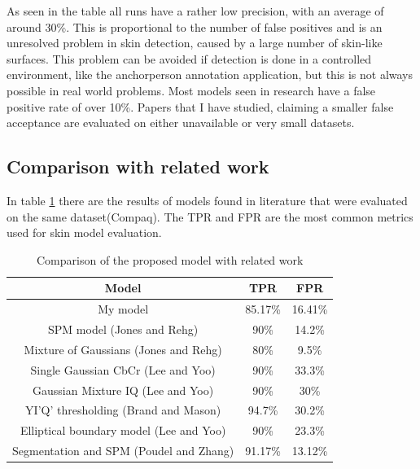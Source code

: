 \documentclass[12pt]{report}
\begin{document}
	As seen in the table all runs have a rather low precision, with an average of around 30\%. This is proportional to the number of false positives and is an unresolved problem in skin detection, caused by a large number of skin-like surfaces. This problem can be avoided if detection is done in a controlled environment, like the anchorperson annotation application, but this is not always possible in real world problems.  Most models seen in research have a false positive rate of over 10\%. Papers that I have studied, claiming a smaller false acceptance are evaluated on either unavailable or very small datasets.

	\subsection{Comparison with related work}
	
	In table \ref{tab:results_comparison} there are the results of models found in literature that were evaluated on the same dataset(Compaq). The TPR and FPR are the most common metrics used for skin model evaluation.
	
	\begin{table}[h!]
		\begin{center}
			\caption{Comparison of the proposed model with related work}
			\label{tab:results_comparison}
			\begin{tabular}{c|c|c}
				\textbf{Model} & \textbf{TPR} & \textbf{FPR} \\
				\hline
				My model & 85.17\% & 16.41\% \\
				SPM model (Jones and Rehg\cite{compaq}) & 90\% & 14.2\% \\
				Mixture of Gaussians (Jones and Rehg\cite{compaq}) & 80\% & 9.5\% \\
				Single Gaussian CbCr (Lee and Yoo\cite{gaussian_applied}) & 90\% & 33.3\% \\
				Gaussian Mixture IQ (Lee and Yoo\cite{gaussian_applied}) & 90\% & 30\% \\
				YI'Q' thresholding (Brand and Mason\cite{i_threshold_applied}) & 94.7\% & 30.2\% \\
				Elliptical boundary model (Lee and Yoo\cite{gaussian_applied}) &
				90\% & 23.3\% \\
				Segmentation and SPM (Poudel and Zhang\cite{superpixels_applied_2}) & 91.17\% & 13.12\% \\
				
			\end{tabular}
		\end{center}
	\end{table}
	
\end{document}
